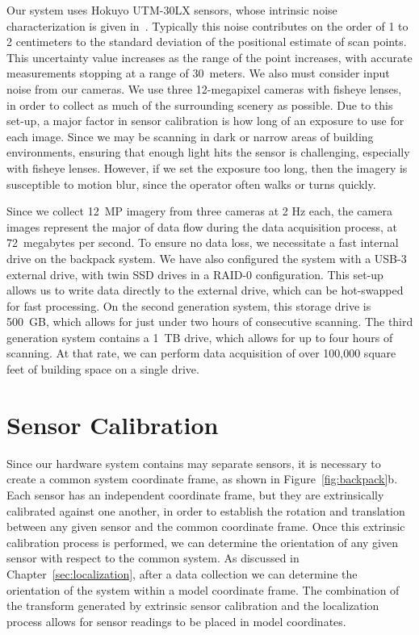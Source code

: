 \documentclass[12pt,onecolumn,oneside]{book}
\begin{document}
Our system uses Hokuyo UTM-30LX sensors, whose intrinsic noise characterization is given in~\cite{Pomerleau12}.  Typically this noise contributes on the order of 1 to 2 centimeters to the standard deviation of the positional estimate of scan points.  This uncertainty value increases as the range of the point increases, with accurate measurements stopping at a range of $30$~meters.  We also must consider input noise from our cameras.  We use three 12-megapixel cameras with fisheye lenses, in order to collect as much of the surrounding scenery as possible.  Due to this set-up, a major factor in sensor calibration is how long of an exposure to use for each image.  Since we may be scanning in dark or narrow areas of building environments, ensuring that enough light hits the sensor is challenging, especially with fisheye lenses.  However, if we set the exposure too long, then the imagery is susceptible to motion blur, since the operator often walks or turns quickly.

Since we collect 12~MP imagery from three cameras at 2 Hz each, the camera images represent the major of data flow during the data acquisition process, at 72~megabytes per second.  To ensure no data loss, we necessitate a fast internal drive on the backpack system.  We have also configured the system with a USB-3 external drive, with twin SSD drives in a RAID-0 configuration.  This set-up allows us to write data directly to the external drive, which can be hot-swapped for fast processing.  On the second generation system, this storage drive is 500~GB, which allows for just under two hours of consecutive scanning.  The third generation system contains a 1~TB drive, which allows for up to four hours of scanning.  At that rate, we can perform data acquisition of over 100,000 square feet of building space on a single drive.

\section{Sensor Calibration}
\label{sec:calibration}

Since our hardware system contains may separate sensors, it is necessary to create a common system coordinate frame, as shown in Figure~\ref{fig:backpack}b.  Each sensor has an independent coordinate frame, but they are extrinsically calibrated against one another, in order to establish the rotation and translation between any given sensor and the common coordinate frame.  Once this extrinsic calibration process is performed, we can determine the orientation of any given sensor with respect to the common system.  As discussed in Chapter~\ref{sec:localization}, after a data collection we can determine the orientation of the system within a model coordinate frame.  The combination of the transform generated by extrinsic sensor calibration and the localization process allows for sensor readings to be placed in model coordinates.
\end{document}
